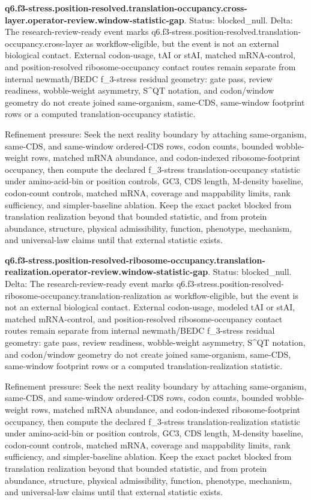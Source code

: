 \textbf{q6.f3-stress.position-resolved.translation-occupancy.cross-layer.operator-review.window-statistic-gap}. Status: blocked\_null. Delta: The research-review-ready event marks q6.f3-stress.position-resolved.translation-occupancy.cross-layer as workflow-eligible, but the event is not an external biological contact. External codon-usage, tAI or stAI, matched mRNA-control, and position-resolved ribosome-occupancy contact routes remain separate from internal newmath/BEDC f\_3-stress residual geometry: gate pass, review readiness, wobble-weight asymmetry, S\textasciicircum{}QT notation, and codon/window geometry do not create joined same-organism, same-CDS, same-window footprint rows or a computed translation-occupancy statistic.

Refinement pressure: Seek the next reality boundary by attaching same-organism, same-CDS, and same-window ordered-CDS rows, codon counts, bounded wobble-weight rows, matched mRNA abundance, and codon-indexed ribosome-footprint occupancy, then compute the declared f\_3-stress translation-occupancy statistic under amino-acid-bin or position controls, GC3, CDS length, M-density baseline, codon-count controls, matched mRNA, coverage and mappability limits, rank sufficiency, and simpler-baseline ablation. Keep the exact packet blocked from translation realization beyond that bounded statistic, and from protein abundance, structure, physical admissibility, function, phenotype, mechanism, and universal-law claims until that external statistic exists.

\textbf{q6.f3-stress.position-resolved-ribosome-occupancy.translation-realization.operator-review.window-statistic-gap}. Status: blocked\_null. Delta: The research-review-ready event marks q6.f3-stress.position-resolved-ribosome-occupancy.translation-realization as workflow-eligible, but the event is not an external biological contact. External codon-usage, modeled tAI or stAI, matched mRNA-control, and position-resolved ribosome-occupancy contact routes remain separate from internal newmath/BEDC f\_3-stress residual geometry: gate pass, review readiness, wobble-weight asymmetry, S\textasciicircum{}QT notation, and codon/window geometry do not create joined same-organism, same-CDS, same-window footprint rows or a computed translation-realization statistic.

Refinement pressure: Seek the next reality boundary by attaching same-organism, same-CDS, and same-window ordered-CDS rows, codon counts, bounded wobble-weight rows, matched mRNA abundance, and codon-indexed ribosome-footprint occupancy, then compute the declared f\_3-stress translation-realization statistic under amino-acid-bin or position controls, GC3, CDS length, M-density baseline, codon-count controls, matched mRNA, coverage and mappability limits, rank sufficiency, and simpler-baseline ablation. Keep the exact packet blocked from translation realization beyond that bounded statistic, and from protein abundance, structure, physical admissibility, function, phenotype, mechanism, and universal-law claims until that external statistic exists.

